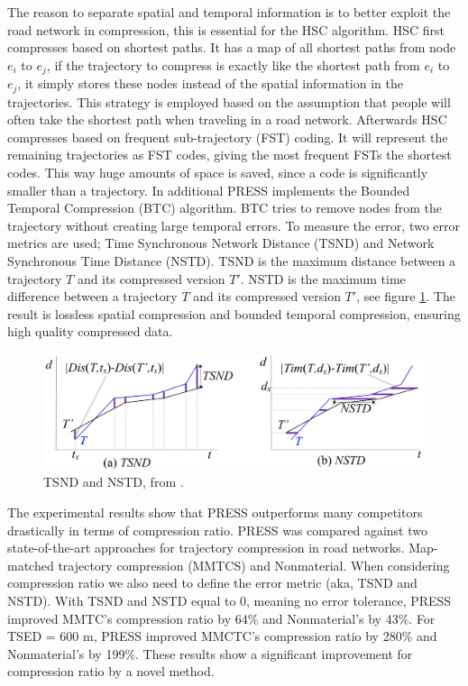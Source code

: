 The reason to separate spatial and temporal information is to better exploit the road network in compression, this is essential for the HSC algorithm. HSC first compresses based on shortest paths. It has a map of all shortest paths from node $e_i$ to $e_j$, if the trajectory to compress is exactly like the shortest path from $e_i$ to $e_j$, it simply stores these nodes instead of the spatial information in the trajectories. This strategy is employed based on the assumption that people will often take the shortest path when traveling in a road network. Afterwards HSC compresses based on frequent sub-trajectory (FST) coding. It will represent the remaining trajectories as FST codes, giving the most frequent FSTs the shortest codes. This way huge amounts of space is saved, since a code is significantly smaller than a trajectory. In additional PRESS implements the Bounded Temporal Compression (BTC) algorithm. BTC tries to remove nodes from the trajectory without creating large temporal errors. To measure the error, two error metrics are used; Time Synchronous Network Distance (TSND) and Network Synchronous Time Distance (NSTD). TSND is the maximum distance between a trajectory $T$ and its compressed version $T'$. NSTD is the maximum time difference between a trajectory $T$ and its compressed version $T'$, see figure \ref{press_error}. The result is lossless spatial compression and bounded temporal compression, ensuring high quality compressed data.

\begin{figure}[t]
    \includegraphics[width=1.0\linewidth]{./figures/press_error.png}
    \caption{TSND and NSTD, from \cite{song2014press}.}
    \label{press_error}
\end{figure}

The experimental results show that PRESS outperforms many competitors drastically in terms of compression ratio. PRESS was compared against two state-of-the-art approaches for trajectory compression in road networks. Map-matched trajectory compression (MMTCS) and Nonmaterial. When considering compression ratio we also need to define the error metric (aka, TSND and NSTD). With TSND and NSTD equal to 0, meaning no error tolerance, PRESS improved MMTC's compression ratio by 64\% and Nonmaterial's by 43\%. For TSED = 600 m, PRESS improved MMCTC's compression ratio by 280\% and Nonmaterial's by 199\%. These results show a significant improvement for compression ratio by a novel method.


